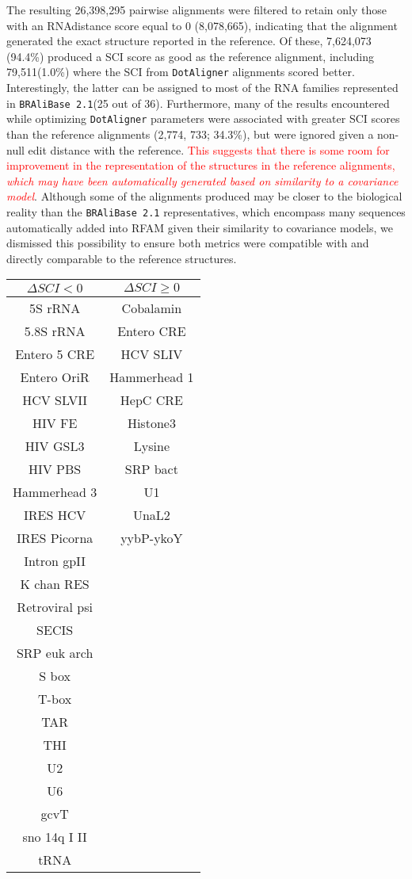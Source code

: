 \documentclass[a4paper,twoside]{article}
\newcommand\dotaligner{\texttt{DotAligner}}
\newcommand\bralibase{\texttt{BRAliBase 2.1}}
\newcommand{\RED}[1]{\textcolor{red}{#1}}
\begin{document}
\noindent The resulting 26,398,295 pairwise alignments were filtered to retain
 only those with an RNAdistance score equal to 0 (8,078,665), indicating that the 
 alignment generated the exact structure reported in the reference.  Of these, 
7,624,073 (94.4\%) produced a SCI score as good as the reference alignment, 
including 79,511(1.0\%) where the SCI from \dotaligner{} alignments scored better. 
Interestingly, the latter can be assigned to most of the RNA families represented 
in \bralibase   (25 out of 36). Furthermore, 
many of the results encountered while optimizing \dotaligner{} parameters were 
associated with greater SCI scores than the reference alignments (2,774, 733; 34.3\%), 
but were ignored given a non-null edit distance with the reference. 
\RED{This  suggests that there is some room for improvement in the representation of the structures in the reference alignments, \emph{which may have been automatically generated based on similarity to a covariance model}}. 
Although some of the alignments produced may be closer to the biological reality 
than the \bralibase{} representatives, which encompass many sequences automatically 
added into RFAM given their similarity to covariance models, we dismissed this 
possibility to ensure both metrics were compatible with and directly comparable 
to the reference structures. 

\begin{tabular}{|c|c|}
\hline 
$\Delta{} SCI < 0$  & $\Delta{} SCI \geq 0$ \\ 
\hline 
5S rRNA & Cobalamin \\
5.8S rRNA & Entero CRE \\
Entero 5 CRE & HCV SLIV \\
Entero OriR & Hammerhead 1 \\
HCV SLVII & HepC CRE \\
HIV FE & Histone3 \\
HIV GSL3 & Lysine\\
HIV PBS & SRP bact \\
Hammerhead 3 & U1 \\
IRES HCV & UnaL2 \\
IRES Picorna & yybP-ykoY \\
Intron gpII & \\
K chan RES & \\
Retroviral psi & \\
SECIS & \\
SRP euk arch & \\
S box & \\
T-box & \\
TAR & \\
THI & \\
U2 & \\
U6 & \\
gcvT & \\
sno 14q I II & \\
tRNA & \\
\hline 
\end{tabular} 
\end{document}
